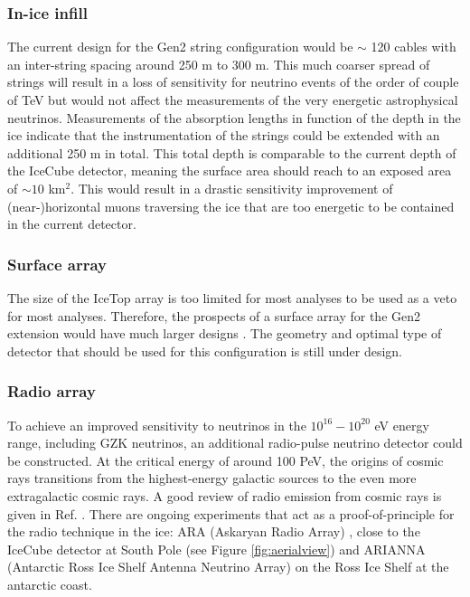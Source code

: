 \subsubsection{In-ice infill}
The current design for the Gen2 string configuration would be $\sim$ 120 cables with an inter-string spacing around 250 m to 300 m. This much coarser spread of strings will result in a loss of sensitivity for neutrino events of the order of couple of TeV but would not affect the measurements of the very energetic astrophysical neutrinos. Measurements of the absorption lengths in function of the depth in the ice indicate that the instrumentation of the strings could be extended with an additional 250 m in total. This total depth is comparable to the current depth of the IceCube detector, meaning the surface area should reach to an exposed area of $\sim 10$ km$^2$. This would result in a drastic sensitivity improvement of (near-)horizontal muons traversing the ice that are too energetic to be contained in the current detector.
\subsubsection{Surface array}
The size of the IceTop array is too limited for most analyses to be used as a veto for most analyses. Therefore, the prospects of a surface array for the Gen2 extension would have much larger designs \cite{Euler:2015oen}. The geometry and optimal type of detector that should be used for this configuration is still under design.
\subsubsection{Radio array}
\label{subsub:radio}
To achieve an improved sensitivity to neutrinos in the $10^{16} - 10^{20}$ eV energy range, including GZK neutrinos, an additional radio-pulse neutrino detector could be constructed. At the critical energy of around 100 PeV, the origins of cosmic rays transitions from the highest-energy galactic sources to the even more extragalactic cosmic rays. A good review of radio emission from cosmic rays is given in Ref. \cite{Schroder:2016hrv}. There are ongoing experiments that act as a proof-of-principle for the radio technique in the ice: ARA (Askaryan Radio Array) \cite{Allison:2015eky}, close to the IceCube detector at South Pole (see Figure \ref{fig:aerialview}) and ARIANNA (Antarctic Ross Ice Shelf Antenna Neutrino Array) \cite{Glaser:2018ifj} on the Ross Ice Shelf at the antarctic coast.



